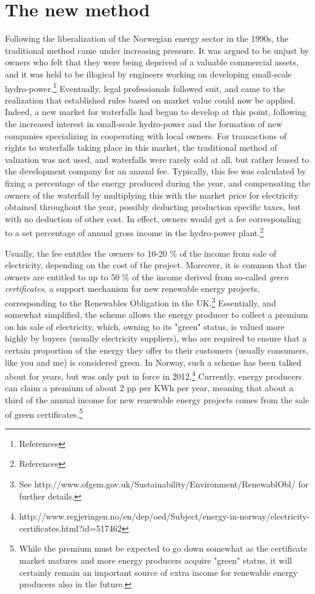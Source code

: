 \section{The new method}\label{sec:new}

Following the liberalization of the Norwegian energy sector in the 1990s, the traditional method came under increasing pressure. It was argued to be unjust by owners who felt that they were being deprived of a valuable commercial assets, and it was held to be illogical by engineers working on developing small-scale hydro-power.\footnote{References} Eventually, legal professionals followed suit, and came to the realization that established rules based on market value could now be applied. Indeed, a new market for waterfalls had begun to develop at this point, following the increased interest in small-scale hydro-power and the formation of new companies specializing in cooperating with local owners. For transactions of rights to waterfalls taking place in this market, the traditional method of valuation was not used, and waterfalls were rarely sold at all, but rather leased to the development company for an annual fee. Typically, this fee was calculated by fixing a percentage of the energy produced during the year, and compensating the owners of the waterfall by multiplying this with the market price for electricity obtained throughout the year, possibly deducting production specific taxes, but with no deduction of other cost. In effect, owners would get a fee corresponding to a set percentage of annual gross income in the hydro-power plant.\footnote{References}

Usually, the fee entitles the owners to 10-20 \% of the income from sale of electricity, depending on the cost of the project. Moreover, it is common that the owners are entitled to up to 50 \% of the income derived from so-called \emph{green certificates}, a support mechanism for new renewable energy projects, corresponding to the Renewables Obligation in the UK.\footnote{See http://www.ofgem.gov.uk/Sustainability/Environment/RenewablObl/ for further details.} Essentially, and somewhat simplified, the scheme allows the energy producer to collect a premium on his sale of electricity, which, owning to its "green" status, is valued more highly by buyers (usually electricity suppliers), who are required to ensure that a certain proportion of the energy they offer to their customers (usually consumers, like you and me) is considered green. In Norway, such a scheme has been talked about for years, but was only put in force in 2012.\footnote{http://www.regjeringen.no/en/dep/oed/Subject/energy-in-norway/electricity-certificates.html?id=517462} Currently, energy producers can claim a premium of about 2 pp per KWh per year, meaning that about a third of the annual income for new renewable energy projects comes from the sale of green certificates.\footnote{While the premium must be expected to go down somewhat as the certificate market matures and more energy producers acquire "green" status, it will certainly remain an important source of extra income for renewable energy producers also in the future.}

